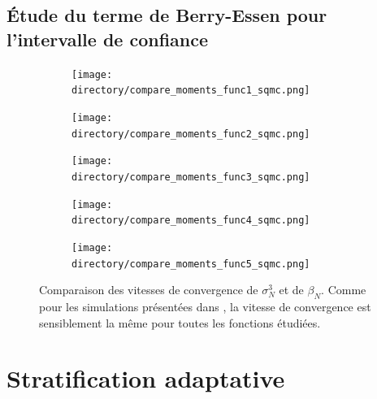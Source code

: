 \documentclass[12pt,a4paper]{report}
\def \directory {/home/jonathan/Programmation/C++/Projet_C++_S2/Images}
\begin{document}
\subsection{Étude du terme de Berry-Essen pour l'intervalle de confiance}
\begin{figure}[H]
\centering
	\begin{subfigure}[scale=1]{0.45\textwidth}
			\texttt{[image: \\directory/compare\_moments\_func1\_sqmc.png]}
	\end{subfigure}
	\hfill
	\begin{subfigure}[scale=1]{0.45\textwidth}
			\texttt{[image: \\directory/compare\_moments\_func2\_sqmc.png]}
	\end{subfigure}
	\vspace{30pt}
	\begin{subfigure}[scale=1]{0.45\textwidth}
			\texttt{[image: \\directory/compare\_moments\_func3\_sqmc.png]}
	\end{subfigure}
	\hfill
	\begin{subfigure}[scale=1]{0.45\textwidth}
			\texttt{[image: \\directory/compare\_moments\_func4\_sqmc.png]}
	\end{subfigure}
	\vspace{30pt}
	\begin{subfigure}[scale=1]{0.45\textwidth}
			\texttt{[image: \\directory/compare\_moments\_func5\_sqmc.png]}
	\end{subfigure}

	
\caption{\small Comparaison des vitesses de convergence de $\sigma^{3}_{N}$ et de $\beta_{N}$. Comme pour les simulations présentées dans \cite{Tu04}, la vitesse de convergence est sensiblement la même pour toutes les fonctions étudiées.}
\label{fig:rqmc_moments}
\end{figure}


\section{Stratification adaptative}
\end{document}
